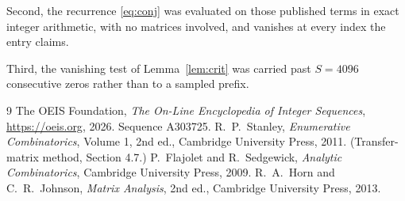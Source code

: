 \documentclass[11pt,a4paper]{article}
\theoremstyle{plain}
\theoremstyle{definition}
\begin{document}
Second, the recurrence \eqref{eq:conj} was evaluated on those published terms in exact
integer arithmetic, with no matrices involved, and vanishes at every index the entry claims.

Third, the vanishing test of Lemma~\ref{lem:crit} was carried past $S=4096$ consecutive
zeros rather than to a sampled prefix.

\begin{thebibliography}{9}
 The OEIS Foundation, \emph{The On-Line Encyclopedia of Integer
Sequences}, \url{https://oeis.org}, 2026. Sequence A303725.
 R.~P.~Stanley, \emph{Enumerative Combinatorics}, Volume 1, 2nd ed.,
Cambridge University Press, 2011. (Transfer-matrix method, Section 4.7.)
 P.~Flajolet and R.~Sedgewick, \emph{Analytic Combinatorics}, Cambridge
University Press, 2009.
 R.~A.~Horn and C.~R.~Johnson, \emph{Matrix Analysis}, 2nd ed., Cambridge
University Press, 2013.
\end{thebibliography}
\end{document}
